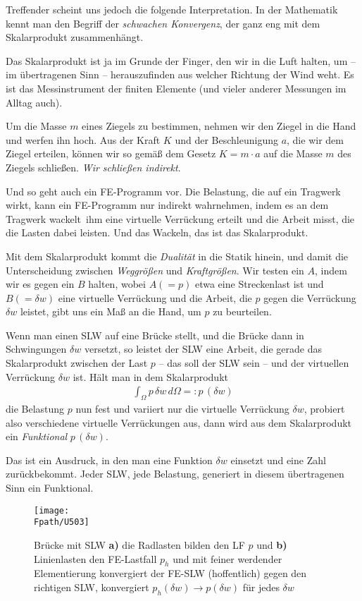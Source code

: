 Treffender scheint uns jedoch die folgende Interpretation. In der Mathematik kennt man den Begriff der {\em schwachen Konvergenz\/}, der ganz eng mit dem Skalarprodukt zusammenh\"{a}ngt.

Das Skalarprodukt ist ja im Grunde der Finger, den wir in die Luft halten, um -- im \"{u}bertragenen Sinn -- herauszufinden aus welcher Richtung der Wind weht. Es ist das Messinstrument der finiten Elemente (und vieler anderer Messungen im Alltag auch).

Um die Masse $m$ eines Ziegels zu bestimmen, nehmen wir den Ziegel in die Hand und werfen ihn hoch. Aus der Kraft $K$ und der Beschleunigung $a$, die wir dem Ziegel erteilen, k\"{o}nnen wir so gem\"{a}{\ss} dem Gesetz $K = m \cdot a$ auf die Masse $m$ des Ziegels schlie{\ss}en. {\em Wir schlie{\ss}en indirekt\/}.

Und so geht auch ein FE-Programm vor. Die Belastung, die auf ein Tragwerk wirkt, kann ein FE-Programm nur indirekt wahrnehmen, indem es an dem Tragwerk \glq wackelt\grq\, ihm eine virtuelle Verr\"{u}ckung erteilt und die Arbeit misst, die die Lasten dabei leisten. Und das Wackeln, das ist das Skalarprodukt.

Mit dem Skalarprodukt kommt die {\em Dualit\"{a}t} in die Statik hinein, und damit die Unterscheidung zwischen {\em Weggr\"{o}{\ss}en} und {\em Kraftgr\"{o}{\ss}en}. Wir testen ein $A$, indem wir es gegen ein $B$ halten, wobei $A (= p)$  etwa eine Streckenlast ist und $B (= \delta w)$ eine virtuelle Verr\"{u}ckung und die Arbeit, die $p$ gegen die Verr\"{u}ckung $\delta w$ leistet, gibt uns ein Ma{\ss} an die Hand, um $p$ zu beurteilen.

Wenn man einen SLW auf eine Br\"{u}cke stellt, und die Br\"{u}cke dann in Schwingungen $\delta w$ versetzt, so leistet der SLW eine Arbeit, die gerade das Skalarprodukt zwischen der Last $p$ -- das soll der SLW sein -- und der virtuellen Verr\"{u}ckung $\delta w$ ist. H\"{a}lt man in dem Skalarprodukt
\begin{align}
\int_{\Omega} p \,\delta w \,d\Omega = : p\,(\delta w)
\end{align}
die Belastung $p$ nun fest und variiert nur die virtuelle Verr\"{u}ckung $\delta w$,
probiert also verschiedene virtuelle Verr\"{u}ckungen aus, dann wird aus dem Skalarprodukt
ein {\em Funktional\/} $p\,(\delta w)$.

Das ist ein Ausdruck, in den man eine Funktion $\delta w$ einsetzt und eine Zahl
zur\"{u}ckbekommt. Jeder SLW, jede Belastung, generiert in diesem \"{u}bertragenen Sinn ein Funktional.
\begin{figure}[tbp] \centering
\if {} \sidecaption \fi
\texttt{[image: \\Fpath/U503]}
\caption{Br\"{u}cke mit SLW {\bf a)} die Radlasten bilden den LF $p$ und {\bf b)} Linienlasten den FE-Lastfall $p_h$ und mit feiner werdender Elementierung konvergiert der FE-SLW (hoffentlich) gegen den richtigen SLW, konvergiert $p_h(\delta w)  \to p(\delta w)$ f\"{u}r jedes $\delta w$} \label{U503}
\end{figure}%

